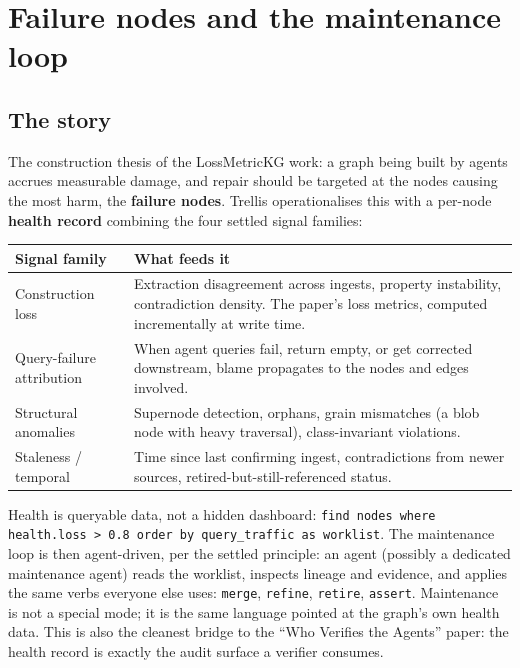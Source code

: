 \documentclass[11pt]{article}
\begin{document}
\section{Failure nodes and the maintenance loop}

\subsection{The story}

The construction thesis of the LossMetricKG work: a graph being built by agents accrues measurable damage, and repair should be targeted at the nodes causing the most harm, the \textbf{failure nodes}. Trellis operationalises this with a per-node \textbf{health record} combining the four settled signal families:

\begin{center}
\small
\begin{tabular}{p{4.2cm}p{9.4cm}}
\toprule
\textbf{Signal family} & \textbf{What feeds it} \\
\midrule
Construction loss & Extraction disagreement across ingests, property instability, contradiction density. The paper's loss metrics, computed incrementally at write time. \\
Query-failure attribution & When agent queries fail, return empty, or get corrected downstream, blame propagates to the nodes and edges involved. \\
Structural anomalies & Supernode detection, orphans, grain mismatches (a blob node with heavy traversal), class-invariant violations. \\
Staleness / temporal & Time since last confirming ingest, contradictions from newer sources, retired-but-still-referenced status. \\
\bottomrule
\end{tabular}
\end{center}

Health is queryable data, not a hidden dashboard: \texttt{find nodes where health.loss > 0.8 order by query\_traffic as worklist}. The maintenance loop is then agent-driven, per the settled principle: an agent (possibly a dedicated maintenance agent) reads the worklist, inspects lineage and evidence, and applies the same verbs everyone else uses: \texttt{merge}, \texttt{refine}, \texttt{retire}, \texttt{assert}. Maintenance is not a special mode; it is the same language pointed at the graph's own health data. This is also the cleanest bridge to the ``Who Verifies the Agents'' paper: the health record is exactly the audit surface a verifier consumes.
\end{document}
